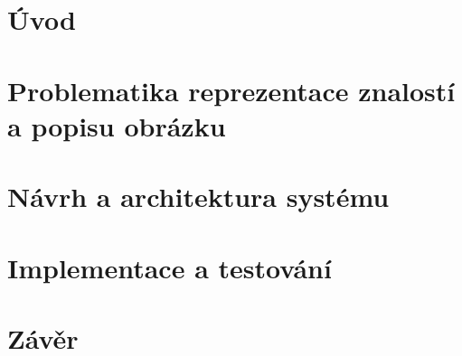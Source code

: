 \documentclass[12pt,a4paper,oneside]{article}
\begin{document}
\tableofcontents

\newpage
\section{Úvod}

\clearpage
\section{Problematika reprezentace znalostí a popisu obrázku}




\clearpage
\section{Návrh a architektura systému}





\clearpage
\section{Implementace a testování}

\section{Závěr}
\end{document}
